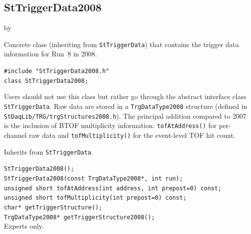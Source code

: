 \documentclass[twoside]{article}
\newcommand{\entrylabel}[1]{\mbox{\textbf{{#1}}}\hfil}%
\newenvironment{entry}
{\begin{list}{}%
    {\renewcommand{\makelabel}{\entrylabel}%
     \setlength{\labelwidth}{90pt}%
     \setlength{\leftmargin}{\labelwidth}
     \advance\leftmargin by \labelsep%
      }%
    }%
  {\end{list}}
\newcommand{\Entrylabel}[1]%
{\raisebox{0pt}[1ex][0pt]{\makebox[\labelwidth][l]%
    {\parbox[t]{\labelwidth}{\hspace{0pt}\textbf{{#1}}}}}}
\newenvironment{Entry}%
{\renewcommand{\entrylabel}{\Entrylabel}\begin{entry}}%
  {\end{entry}}
\begin{document}
\subsection{StTriggerData2008}
\label{sec:StTriggerData2008}
\begin{Entry}
\item[Summary] Concrete class (inheriting from \texttt{StTriggerData}) that
    contains the trigger data information for Run~8 in 2008.
\item[Synopsis]
    \verb+#include "StTriggerData2008.h"+\\
    \verb+class StTriggerData2008;+\\
\item[Description] Users should not use this class but rather go through the
    abstract interface class \texttt{StTriggerData}.  Raw data are stored in a
    \verb+TrgDataType2008+ structure (defined in
    \texttt{StDaqLib/TRG/trgStructures2008.h}).  The principal addition compared
    to 2007 is the inclusion of BTOF multiplicity information:
    \verb+tofAtAddress()+ for per-channel raw data and
    \verb+tofMultiplicity()+ for the event-level TOF hit count.
\item[Related Classes] Inherits from \texttt{StTriggerData}.
\item[Public\\ Constructors]
    \verb+StTriggerData2008();+\\
    \verb+StTriggerData2008(const TrgDataType2008*, int run);+\\
    \verb+unsigned short tofAtAddress(int address, int prepost=0) const;+\\
    \verb+unsigned short tofMultiplicity(int prepost=0) const;+\\
    \verb+char* getTriggerStructure();+\\
    \verb+TrgDataType2008* getTriggerStructure2008();+\\
    Experts only.
\end{Entry}
\clearpage
\end{document}
